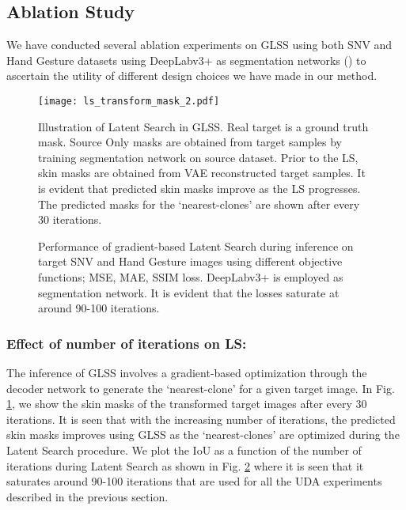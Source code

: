 \documentclass[runningheads]{llncs}
\begin{document}
\subsection{Ablation Study}
We have conducted several ablation experiments on GLSS using both SNV and Hand Gesture datasets using DeepLabv3+ as segmentation networks () to ascertain the utility of different design choices we have made in our method. 
\begin{figure}[h]
\begin{center}
\texttt{[image: ls\_transform\_mask\_2.pdf]}
    \caption{Illustration of Latent Search in GLSS. Real target is a ground truth mask. Source Only masks are obtained from target samples by training segmentation network  on source dataset. Prior to the LS, skin masks are obtained from VAE reconstructed target samples. It is evident that predicted skin masks improve as the LS progresses. The predicted masks for the `nearest-clones' are shown after every 30 iterations.}
    \label{fig:LStransformMask}
\end{center}
\end{figure}
\begin{figure}[h]

    \hfill
    \caption{Performance of gradient-based Latent Search during inference on target SNV and Hand Gesture images using different objective functions; MSE, MAE, SSIM loss. DeepLabv3+  is employed as segmentation network. It is evident that the losses saturate at around 90-100 iterations.}
    \label{fig:losa}
\end{figure}
\subsubsection{Effect of number of iterations on LS:}
The inference of GLSS involves a gradient-based optimization through the decoder network  to generate the `nearest-clone' for a given target image. In Fig. \ref{fig:LStransformMask}, we show the skin masks of the transformed target images after every 30 iterations. 
It is seen that with the increasing number of iterations, the predicted skin masks improves using GLSS as the `nearest-clones' are optimized during the Latent Search procedure. 
We plot the IoU as a function of the number of iterations during Latent Search as shown in Fig. \ref{fig:losa} where it is seen that it saturates around 90-100 iterations that are used for all the UDA experiments described in the previous section. 
\end{document}
